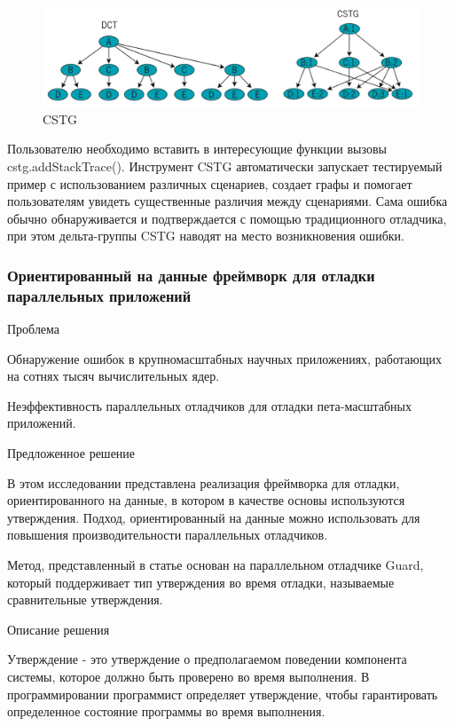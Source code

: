 \begin{figure}[h]
	\centering
	\includegraphics[width=1\textwidth]{ResearchNotes/rndhpc_not_edt_2021_11_10/krekhtunova/cstg2.png}
	\caption{CSTG} 
\end{figure}

Пользователю необходимо вставить в интересующие функции вызовы cstg.addStackTrace(). Инструмент CSTG автоматически запускает тестируемый пример с использованием различных сценариев, создает графы и помогает пользователям увидеть существенные различия между сценариями. Сама ошибка обычно обнаруживается и подтверждается с помощью традиционного отладчика, при этом дельта-группы CSTG наводят на место возникновения ошибки.

\subsubsection{Ориентированный на данные фреймворк для отладки параллельных приложений \cite{Dinh2013}}

Проблема

Обнаружение ошибок в крупномасштабных научных приложениях, работающих на сотнях тысяч вычислительных ядер.

Неэффективность параллельных отладчиков для отладки пета-масштабных приложений.
\newline

Предложенное решение

В этом исследовании представлена реализация фреймворка для отладки, ориентированного на данные, в котором в качестве основы используются утверждения.
Подход, ориентированный на данные можно использовать для повышения производительности параллельных отладчиков. 

Метод, представленный в статье основан на параллельном отладчике Guard, который поддерживает тип утверждения во время отладки, называемые сравнительные утверждения. 
\newline

Описание решения

Утверждение - это утверждение о предполагаемом поведении компонента системы, которое должно быть проверено во время выполнения. В программировании программист определяет утверждение, чтобы гарантировать определенное состояние программы во время выполнения.

